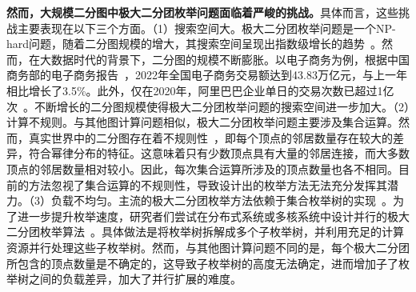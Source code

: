 \textbf{然而，大规模二分图中极大二分团枚举问题面临着严峻的挑战。}具体而言，这些挑战主要表现在以下三个方面。（1）搜索空间大。极大二分团枚举问题是一个NP-hard问题，随着二分图规模的增大，其搜索空间呈现出指数级增长的趋势~\cite{MICA04}。然而，在大数据时代的背景下，二分图的规模不断膨胀。以电子商务为例，根据中国商务部的电子商务报告~\cite{ECommerceReport}，2022年全国电子商务交易额达到43.83万亿元，与上一年相比增长了3.5\%。此外，仅在2020年，阿里巴巴企业单日的交易次数已超过1亿次~\cite{MEB20}。不断增长的二分图规模使得极大二分团枚举问题的搜索空间进一步加大。（2）计算不规则。与其他图计算问题相似，极大二分团枚举问题主要涉及集合运算。然而，真实世界中的二分图存在着不规则性~\cite{Irregularity12}，即每个顶点的邻居数量存在较大的差异，符合幂律分布的特征。这意味着只有少数顶点具有大量的邻居连接，而大多数顶点的邻居数量相对较小。因此，每次集合运算所涉及的顶点数量也各不相同。目前的方法忽视了集合运算的不规则性，导致设计出的枚举方法无法充分发挥其潜力。（3）负载不均匀。主流的极大二分团枚举方法依赖于集合枚举树的实现~\cite{minel06,iMBEA14,PMBE20,ooMBE22}。为了进一步提升枚举速度，研究者们尝试在分布式系统或多核系统中设计并行的极大二分团枚举算法~\cite{mapreduceMBE16,parMBE19}。具体做法是将枚举树拆解成多个子枚举树，并利用充足的计算资源并行处理这些子枚举树。然而，与其他图计算问题不同的是，每个极大二分团所包含的顶点数量是不确定的，这导致子枚举树的高度无法确定，进而增加子了枚举树之间的负载差异，加大了并行扩展的难度。





